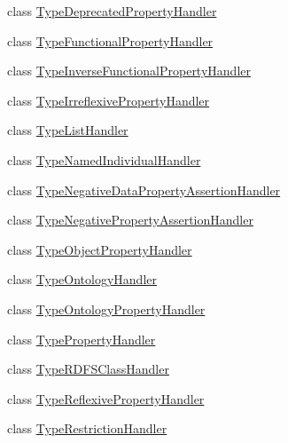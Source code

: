 \begin{DoxyCompactItemize}
class \hyperlink{classorg_1_1coode_1_1owlapi_1_1rdfxml_1_1parser_1_1_type_deprecated_property_handler}{Type\-Deprecated\-Property\-Handler}
\item 
class \hyperlink{classorg_1_1coode_1_1owlapi_1_1rdfxml_1_1parser_1_1_type_functional_property_handler}{Type\-Functional\-Property\-Handler}
\item 
class \hyperlink{classorg_1_1coode_1_1owlapi_1_1rdfxml_1_1parser_1_1_type_inverse_functional_property_handler}{Type\-Inverse\-Functional\-Property\-Handler}
\item 
class \hyperlink{classorg_1_1coode_1_1owlapi_1_1rdfxml_1_1parser_1_1_type_irreflexive_property_handler}{Type\-Irreflexive\-Property\-Handler}
\item 
class \hyperlink{classorg_1_1coode_1_1owlapi_1_1rdfxml_1_1parser_1_1_type_list_handler}{Type\-List\-Handler}
\item 
class \hyperlink{classorg_1_1coode_1_1owlapi_1_1rdfxml_1_1parser_1_1_type_named_individual_handler}{Type\-Named\-Individual\-Handler}
\item 
class \hyperlink{classorg_1_1coode_1_1owlapi_1_1rdfxml_1_1parser_1_1_type_negative_data_property_assertion_handler}{Type\-Negative\-Data\-Property\-Assertion\-Handler}
\item 
class \hyperlink{classorg_1_1coode_1_1owlapi_1_1rdfxml_1_1parser_1_1_type_negative_property_assertion_handler}{Type\-Negative\-Property\-Assertion\-Handler}
\item 
class \hyperlink{classorg_1_1coode_1_1owlapi_1_1rdfxml_1_1parser_1_1_type_object_property_handler}{Type\-Object\-Property\-Handler}
\item 
class \hyperlink{classorg_1_1coode_1_1owlapi_1_1rdfxml_1_1parser_1_1_type_ontology_handler}{Type\-Ontology\-Handler}
\item 
class \hyperlink{classorg_1_1coode_1_1owlapi_1_1rdfxml_1_1parser_1_1_type_ontology_property_handler}{Type\-Ontology\-Property\-Handler}
\item 
class \hyperlink{classorg_1_1coode_1_1owlapi_1_1rdfxml_1_1parser_1_1_type_property_handler}{Type\-Property\-Handler}
\item 
class \hyperlink{classorg_1_1coode_1_1owlapi_1_1rdfxml_1_1parser_1_1_type_r_d_f_s_class_handler}{Type\-R\-D\-F\-S\-Class\-Handler}
\item 
class \hyperlink{classorg_1_1coode_1_1owlapi_1_1rdfxml_1_1parser_1_1_type_reflexive_property_handler}{Type\-Reflexive\-Property\-Handler}
\item 
class \hyperlink{classorg_1_1coode_1_1owlapi_1_1rdfxml_1_1parser_1_1_type_restriction_handler}{Type\-Restriction\-Handler}

\end{DoxyCompactItemize}
